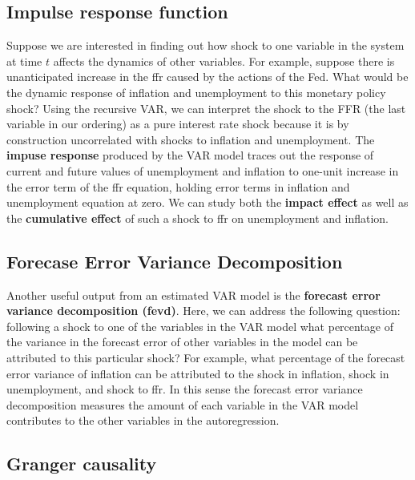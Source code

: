 \documentclass[]{book}
\theoremstyle{definition}
\theoremstyle{definition}
\theoremstyle{definition}
\theoremstyle{remark}
\begin{document}
\hypertarget{impulse-response-function}{%
\subsection{Impulse response function}\label{impulse-response-function}}

Suppose we are interested in finding out how shock to one variable in the system at time \(t\) affects the dynamics of other variables. For example, suppose there is unanticipated increase in the ffr caused by the actions of the Fed. What would be the dynamic response of inflation and unemployment to this monetary policy shock? Using the recursive VAR, we can interpret the shock to the FFR (the last variable in our ordering) as a pure interest rate shock because it is by construction uncorrelated with shocks to inflation and unemployment. The \textbf{impuse response} produced by the VAR model traces out the response of current and future values of unemployment and inflation to one-unit increase in the error term of the ffr equation, holding error terms in inflation and unemployment equation at zero. We can study both the \textbf{impact effect} as well as the \textbf{cumulative effect} of such a shock to ffr on unemployment and inflation.

\hypertarget{forecase-error-variance-decomposition}{%
\subsection{Forecase Error Variance Decomposition}\label{forecase-error-variance-decomposition}}

Another useful output from an estimated VAR model is the \textbf{forecast error variance decomposition (fevd)}. Here, we can address the following question: following a shock to one of the variables in the VAR model what percentage of the variance in the forecast error of other variables in the model can be attributed to this particular shock? For example, what percentage of the forecast error variance of inflation can be attributed to the shock in inflation, shock in unemployment, and shock to ffr. In this sense the forecast error variance decomposition measures the amount of each variable in the VAR model contributes to the other variables in the autoregression.

\hypertarget{granger-causality}{%
\subsection{Granger causality}\label{granger-causality}}
\end{document}

